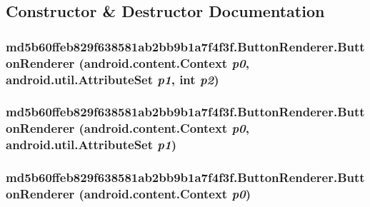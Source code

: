 \subsection{Constructor \& Destructor Documentation}
\hypertarget{classmd5b60ffeb829f638581ab2bb9b1a7f4f3f_1_1_button_renderer_44933cd78b3f547dc6c6282043506ae5}{
\subsubsection[{ButtonRenderer}]{\setlength{\rightskip}{0pt plus 5cm}md5b60ffeb829f638581ab2bb9b1a7f4f3f.ButtonRenderer.ButtonRenderer (android.content.Context {\em p0}, \/  android.util.AttributeSet {\em p1}, \/  int {\em p2})}}
\label{classmd5b60ffeb829f638581ab2bb9b1a7f4f3f_1_1_button_renderer_44933cd78b3f547dc6c6282043506ae5}


\hypertarget{classmd5b60ffeb829f638581ab2bb9b1a7f4f3f_1_1_button_renderer_e0d491f966e2aef899b84d42c9d2ae43}{
\subsubsection[{ButtonRenderer}]{\setlength{\rightskip}{0pt plus 5cm}md5b60ffeb829f638581ab2bb9b1a7f4f3f.ButtonRenderer.ButtonRenderer (android.content.Context {\em p0}, \/  android.util.AttributeSet {\em p1})}}
\label{classmd5b60ffeb829f638581ab2bb9b1a7f4f3f_1_1_button_renderer_e0d491f966e2aef899b84d42c9d2ae43}


\hypertarget{classmd5b60ffeb829f638581ab2bb9b1a7f4f3f_1_1_button_renderer_ef5f692cbf4180a0d0683aaaec08d3ae}{
\subsubsection[{ButtonRenderer}]{\setlength{\rightskip}{0pt plus 5cm}md5b60ffeb829f638581ab2bb9b1a7f4f3f.ButtonRenderer.ButtonRenderer (android.content.Context {\em p0})}}
\label{classmd5b60ffeb829f638581ab2bb9b1a7f4f3f_1_1_button_renderer_ef5f692cbf4180a0d0683aaaec08d3ae}




